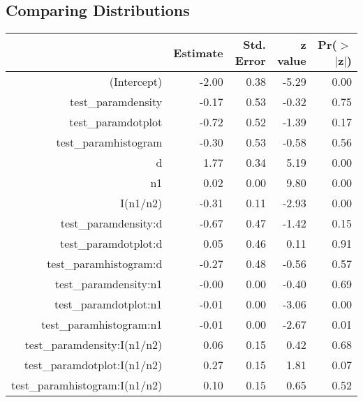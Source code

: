 \subsection{Comparing Distributions}

\begin{table}[ht]
\begin{center}
\begin{tabular}{rrrrr}
  \hline
 & Estimate & Std. Error & z value & Pr($>$$|$z$|$) \\ 
  \hline
(Intercept) & -2.00 & 0.38 & -5.29 & 0.00 \\ 
  test\_paramdensity & -0.17 & 0.53 & -0.32 & 0.75 \\ 
  test\_paramdotplot & -0.72 & 0.52 & -1.39 & 0.17 \\ 
  test\_paramhistogram & -0.30 & 0.53 & -0.58 & 0.56 \\ 
  d & 1.77 & 0.34 & 5.19 & 0.00 \\ 
  n1 & 0.02 & 0.00 & 9.80 & 0.00 \\ 
  I(n1/n2) & -0.31 & 0.11 & -2.93 & 0.00 \\ 
  test\_paramdensity:d & -0.67 & 0.47 & -1.42 & 0.15 \\ 
  test\_paramdotplot:d & 0.05 & 0.46 & 0.11 & 0.91 \\ 
  test\_paramhistogram:d & -0.27 & 0.48 & -0.56 & 0.57 \\ 
  test\_paramdensity:n1 & -0.00 & 0.00 & -0.40 & 0.69 \\ 
  test\_paramdotplot:n1 & -0.01 & 0.00 & -3.06 & 0.00 \\ 
  test\_paramhistogram:n1 & -0.01 & 0.00 & -2.67 & 0.01 \\ 
  test\_paramdensity:I(n1/n2) & 0.06 & 0.15 & 0.42 & 0.68 \\ 
  test\_paramdotplot:I(n1/n2) & 0.27 & 0.15 & 1.81 & 0.07 \\ 
  test\_paramhistogram:I(n1/n2) & 0.10 & 0.15 & 0.65 & 0.52 \\ 
   \hline
\end{tabular}
\end{center}
\end{table}
